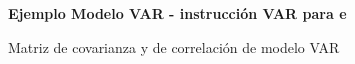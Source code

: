 	
	\begin{figure}[H]
		\centering
		\textbf{Ejemplo Modelo VAR - instrucci\'on VAR para e}\par\medskip
		\caption{Matriz de covarianza y de correlación de modelo VAR}\label{fig44}
	\end{figure}
	

